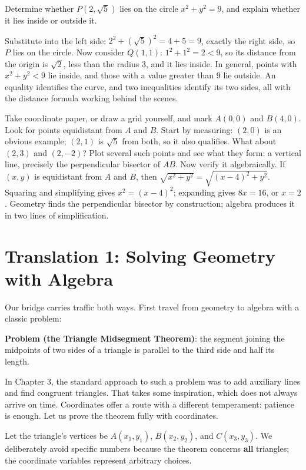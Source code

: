\begin{li}
Determine whether $P(2,\sqrt{5})$ lies on the circle $x^{2}+y^{2}=9$, and explain whether it lies inside or outside it.

Substitute into the left side: $2^{2}+(\sqrt{5})^{2}=4+5=9$, exactly the right side, so $P$ lies on the circle. Now consider $Q(1,1)$: $1^{2}+1^{2}=2<9$, so its distance from the origin is $\sqrt{2}$, less than the radius $3$, and it lies inside. In general, points with $x^{2}+y^{2}<9$ lie inside, and those with a value greater than $9$ lie outside. An equality identifies the curve, and two inequalities identify its two sides, all with the distance formula working behind the scenes.
\end{li}

\begin{shiyan}
Take coordinate paper, or draw a grid yourself, and mark $A(0,0)$ and $B(4,0)$. Look for points equidistant from $A$ and $B$. Start by measuring: $(2,0)$ is an obvious example; $(2,1)$ is $\sqrt{5}$ from both, so it also qualifies. What about $(2,3)$ and $(2,-2)$? Plot several such points and see what they form: a vertical line, precisely the perpendicular bisector of $AB$. Now verify it algebraically. If $(x,y)$ is equidistant from $A$ and $B$, then $\sqrt{x^{2}+y^{2}}=\sqrt{(x-4)^{2}+y^{2}}$. Squaring and simplifying gives $x^{2}=(x-4)^{2}$; expanding gives $8x=16$, or $x=2$. Geometry finds the perpendicular bisector by construction; algebra produces it in two lines of simplification.
\end{shiyan}

\section{Translation 1: Solving Geometry with Algebra}

Our bridge carries traffic both ways. First travel from geometry to algebra with a classic problem:

\textbf{Problem (the Triangle Midsegment Theorem)}: the segment joining the midpoints of two sides of a triangle is parallel to the third side and half its length.

In Chapter 3, the standard approach to such a problem was to add auxiliary lines and find congruent triangles. That takes some inspiration, which does not always arrive on time. Coordinates offer a route with a different temperament: patience is enough. Let us prove the theorem fully with coordinates.

Let the triangle's vertices be $A(x_{1},y_{1})$, $B(x_{2},y_{2})$, and $C(x_{3},y_{3})$. We deliberately avoid specific numbers because the theorem concerns \textbf{all} triangles; the coordinate variables represent arbitrary choices.

